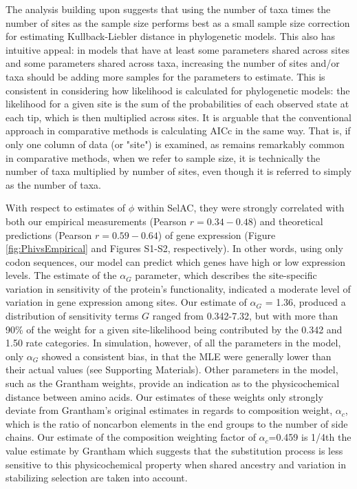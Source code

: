 \documentclass[12pt,letterpaper,fleqn]{article}
\newcommand{\selac}{SelAC\xspace}
\newcommand{\alphac}{\ensuremath{\alpha_c}\xspace}
\newcommand{\alphag}{\ensuremath{\alpha_G}\xspace}
\begin{document}
The analysis building upon \citet{Jhwuengetal2014}  suggests that using the number of taxa times the number of sites as the sample size performs best as a small sample size correction for estimating Kullback-Liebler distance in phylogenetic models. This also has intuitive appeal: in models that have at least some parameters shared across sites and some parameters shared across taxa, increasing the number of sites and/or taxa should be adding more samples for the parameters to estimate.
This is consistent in considering how likelihood is calculated for phylogenetic models: the likelihood for a given site is the sum of the probabilities of each observed state at each tip, which is then multiplied across sites.
It is arguable that the conventional approach in comparative methods is calculating AICc in the same way.
That is, if only one column of data (or "site") is examined, as remains remarkably common in comparative methods, when we refer to sample size, it is technically the number of taxa multiplied by number of sites, even though it is referred to simply as the number of taxa.

With respect to estimates of $\phi$ within \selac, they were strongly correlated with both our empirical measurements (Pearson $r = 0.34-0.48$) and theoretical predictions (Pearson $r = 0.59-0.64$) of gene expression (Figure \ref{fig:PhivsEmpirical} and Figures S1-S2, respectively).
In other words, using only codon sequences, our model can predict which genes have high or low expression levels.
The estimate of the $\alphag$ parameter, which describes the site-specific variation in sensitivity of the protein's functionality, indicated a moderate level of variation in gene expression among sites.
Our estimate of $\alphag$ = 1.36, produced a distribution of sensitivity terms $G$ ranged from 0.342-7.32, but with more than 90\% of the weight for a given site-likelihood being contributed by the 0.342 and 1.50 rate categories.
In simulation, however, of all the parameters in the model, only $\alphag$ showed a consistent bias, in that the MLE were generally lower than their actual values (see Supporting Materials).
Other parameters in the model, such as the Grantham weights, provide an indication as to the physicochemical distance between amino acids.
Our estimates of these weights only strongly deviate from Grantham's \citeyear{Grantham1974} original estimates in regards to composition weight, $\alphac$, which is the ratio of noncarbon elements in the end groups to the number of side chains.
Our estimate of the composition weighting factor of $\alphac$=0.459 is 1/4th the value estimate by Grantham which suggests that the substitution process is less sensitive to this physicochemical property when shared ancestry and variation in stabilizing selection are taken into account.
\end{document}
